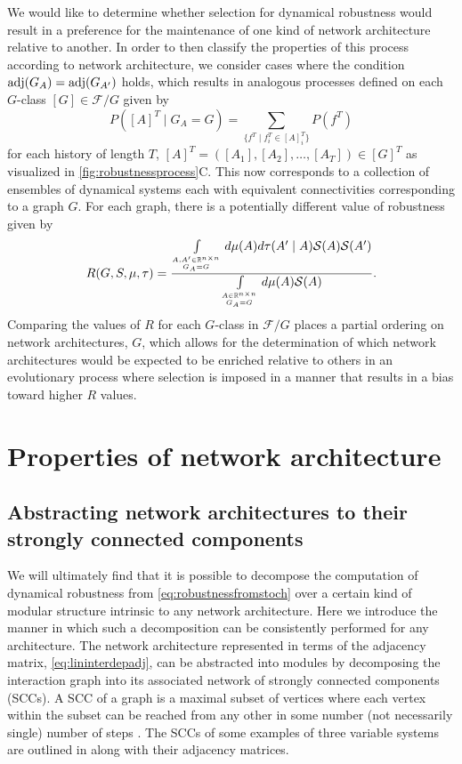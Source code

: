 We would like to determine whether selection for dynamical robustness would result in a preference for the maintenance of one kind of network architecture relative to another. In order to then classify the properties of this process according to network architecture, we consider cases where the condition $\mathrm{adj}(G_A) = \mathrm{adj}(G_{A'})$ holds, which results in analogous processes defined on each $G$-class $[G] \in \mathcal{F}/G$ given by
$$
P([A]^T \mid G_A {=} G) = \sum_{ \{ f^T \mid f_i^T \in [A]_i^T \} } P(f^T)
$$
for each history of length $T$, $[A]^T = ( [A_1], [A_2], \ldots, [A_T] ) \in [G]^T$
as visualized in \ref{fig:robustnessprocess}C. This now corresponds to a collection of ensembles of dynamical systems each with equivalent connectivities corresponding to a graph $G$. For each graph, there is a potentially different value of robustness given by
\begin{equation}\label{eq:robustnessbygraph}
\begin{aligned}
R(G,S,\mu,\tau)  =
 \frac{\int\limits_{A,A' \in \mathbb{R}^{n \times n} \atop G_A = G} d\mu(A) d\tau(A' \mid A) \mathcal{S}(A) \mathcal{S}(A')}{\int\limits_{A \in \mathbb{R}^{n \times n} \atop G_A = G} d\mu(A) \mathcal{S}(A)}.
\end{aligned}
\end{equation}
Comparing the values of $R$ for each $G$-class in $\mathcal{F}/G$ places a partial ordering on network architectures, $G$, which allows for the determination of which network architectures would be expected to be enriched relative to others in an evolutionary process where selection is imposed in a manner that results in a bias toward higher $R$ values.

\section{Properties of network architecture}

\subsection{Abstracting network architectures to their strongly connected components}
We will ultimately find that it is possible to decompose the computation of dynamical robustness from \ref{eq:robustnessfromstoch} over a certain kind of modular structure intrinsic to any network architecture. Here we introduce the manner in which such a decomposition can be consistently performed for any architecture. The network architecture represented in terms of the adjacency matrix, \ref{eq:lininterdepadj}, can be abstracted into modules by decomposing the interaction graph into its associated network of strongly connected components (SCCs). A SCC of a graph is a maximal subset of vertices where each vertex within the subset can be reached from any other in some number (not necessarily single) number of steps \cite{Cormen2009}. The SCCs of some examples of three variable systems are outlined in  along with their adjacency matrices.

